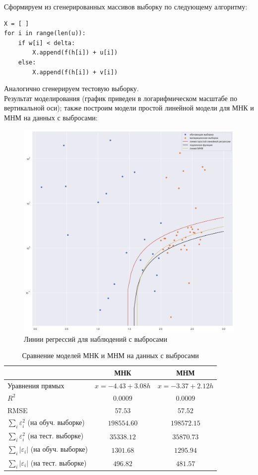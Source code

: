 \documentclass[a4paper,12pt]{article}
\begin{document}
Сформируем из сгенерированных массивов выборку по следующему алгоритму:
\begin{verbatim}
X = [ ]
for i in range(len(u)):
    if w[i] < delta:
        X.append(f(h[i]) + u[i])
    else:
        X.append(f(h[i]) + v[i])
\end{verbatim}

Аналогично сгенерируем тестовую выборку.\\
Результат моделирования (график приведен в логарифмическом масштабе по вертикальной оси); также построим модели простой линейной модели для МНК и МНМ на данных с выбросами:

\begin{figure}[H]
    \centering
    \includegraphics[width=0.5\linewidth]{src/img/простая_линейная регрессия_с_выбросами.png}
    \caption{Линии регрессий для наблюдений с выбросами}
\end{figure}

\begin{table}[H]
    \centering
    \begin{tabular}{|l|c|c|}
        \hline
        & МНК & МНМ \\ \hline
        Уравнения прямых & $x = -4.43 + 3.08 h$ & $x = -3.37 + 2.12 h$ \\ \hline
        $R^2$ & $0.0009$ & $0.0009$ \\ \hline
        RMSE & $57.53$ & $57.52$ \\ \hline
        $\sum\limits_i \varepsilon_i^2$ (на обуч. выборке) & $198554.60$ & $198572.15$ \\ \hline
        $\sum\limits_i \varepsilon_i^2$ (на тест. выборке) & $35338.12$ & $35870.73$ \\ \hline
        $\sum\limits_i |\varepsilon_i|$ (на обуч. выборке) & $1301.68$ & $1295.94$ \\ \hline
        $\sum\limits_i |\varepsilon_i|$ (на тест. выборке) & $496.82$ & $481.57$ \\ \hline
    \end{tabular}
    \caption{Сравнение моделей МНК и МНМ на данных с выбросами}
\end{table}
\end{document}
